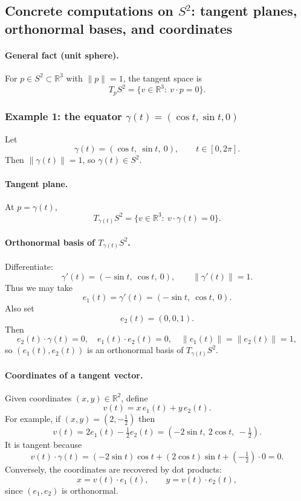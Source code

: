 \documentclass[12pt,a4paper]{article}
\theoremstyle{plain}
\theoremstyle{definition}      %
\begin{document}
	
	\subsection*{Concrete computations on $S^2$: tangent planes, orthonormal bases, and coordinates}
	
	\paragraph{General fact (unit sphere).}
	For $p\in S^2\subset\mathbb{R}^3$ with $\|p\|=1$, the tangent space is
	\[
	T_pS^2=\{v\in\mathbb{R}^3:\ v\cdot p=0\}.
	\]
	
	\subsubsection*{Example 1: the equator $\gamma(t)=(\cos t,\sin t,0)$}
	
	Let
	\[
	\gamma(t)=(\cos t,\ \sin t,\ 0),\qquad t\in[0,2\pi].
	\]
	Then $\|\gamma(t)\|=1$, so $\gamma(t)\in S^2$.
	
	\paragraph{Tangent plane.}
	At $p=\gamma(t)$,
	\[
	T_{\gamma(t)}S^2=\{v\in\mathbb{R}^3:\ v\cdot \gamma(t)=0\}.
	\]
	
	\paragraph{Orthonormal basis of $T_{\gamma(t)}S^2$.}
	Differentiate:
	\[
	\gamma'(t)=(-\sin t,\ \cos t,\ 0),\qquad \|\gamma'(t)\|=1.
	\]
	Thus we may take
	\[
	e_1(t)=\gamma'(t)=(-\sin t,\ \cos t,\ 0).
	\]
	Also set
	\[
	e_2(t)=(0,0,1).
	\]
	Then
	\[
	e_2(t)\cdot \gamma(t)=0,\quad e_1(t)\cdot e_2(t)=0,\quad \|e_1(t)\|=\|e_2(t)\|=1,
	\]
	so $(e_1(t),e_2(t))$ is an orthonormal basis of $T_{\gamma(t)}S^2$.
	
	\paragraph{Coordinates of a tangent vector.}
	Given coordinates $(x,y)\in\mathbb{R}^2$, define
	\[
	v(t)=x\,e_1(t)+y\,e_2(t).
	\]
	For example, if $(x,y)=(2,-\tfrac12)$ then
	\[
	v(t)=2e_1(t)-\tfrac12 e_2(t)=(-2\sin t,\ 2\cos t,\ -\tfrac12).
	\]
	It is tangent because
	\[
	v(t)\cdot \gamma(t)=(-2\sin t)\cos t + (2\cos t)\sin t + (-\tfrac12)\cdot 0 = 0.
	\]
	Conversely, the coordinates are recovered by dot products:
	\[
	x=v(t)\cdot e_1(t),\qquad y=v(t)\cdot e_2(t),
	\]
	since $(e_1,e_2)$ is orthonormal.
	
\end{document}
